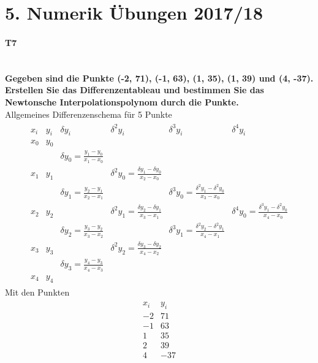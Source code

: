 \documentclass[10pt,a4paper]{article}
\begin{document}
	\section*{5. Numerik Übungen 2017/18}
	\paragraph{T7}\mbox{}\\
	\textbf{Gegeben sind die Punkte (-2, 71), (-1, 63), (1, 35), (1, 39) und (4, -37).\\
	Erstellen Sie das Differenzentableau und bestimmen Sie das Newtonsche Interpolationspolynom durch die Punkte.} \\
	Allgemeines Differenzenschema für 5 Punkte
   \begin{align*}
   \begin{array}{cc|cccc}
   	x_i & y_i &              \delta y_i              &                     \delta^2 y_i                     &                       \delta^3 y_i                       &                       \delta^4 y_i                       \\ \hline
   	x_0 & y_0 &  \\
   	    &     & \delta y_0 = \frac{y_1-y_0}{x_1-x_0} &  \\
   	x_1 & y_1 &                                      & \delta^2 y_0 = \frac{\delta y_1-\delta y_0}{x_2-x_0} &  \\
   	    &     & \delta y_1 = \frac{y_2-y_1}{x_2-x_1} &                                                      & \delta^3 y_0 = \frac{\delta^2 y_1-\delta^2 y_0}{x_3-x_0} &  \\
   	x_2 & y_2 &                                      & \delta^2 y_1 = \frac{\delta y_2-\delta y_1}{x_3-x_1} &                                                          & \delta^4 y_0 = \frac{\delta^3 y_1-\delta^2 y_0}{x_4-x_0} \\
   	    &     & \delta y_2 = \frac{y_3-y_2}{x_3-x_2} &                                                      & \delta^3 y_1 = \frac{\delta^2 y_2-\delta^2 y_1}{x_4-x_1} &  \\
   	x_3 & y_3 &                                      & \delta^2 y_2 = \frac{\delta y_3-\delta y_2}{x_4-x_2} &  \\
   	    &     & \delta y_3 = \frac{y_4-y_3}{x_4-x_3} &  \\
   	x_4 & y_4 &
   \end{array}
   \end{align*}
   Mit den Punkten
   \begin{align*}
   	\begin{array}{rr}
	   	x_i & y_i \\
   		-2 & 71  \\
   		-1 & 63  \\
   		1  & 35  \\
   		2  & 39  \\
   		4  & -37
   	\end{array}
   \end{align*}
\end{document}
